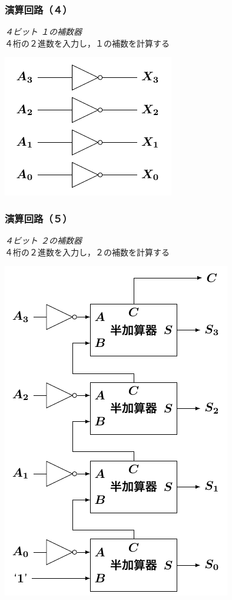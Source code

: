 \documentclass{beamer}                 %
\begin{document}
\begin{frame}
  \frametitle{演算回路（４）}
  \emph{４ビット １の補数器} \\
  ４桁の２進数を入力し，１の補数を計算する
  \vfill
  \centerline{\includegraphics[scale=1.0]{../Tikz/onesc.pdf}}
  \vfill
\end{frame}

\begin{frame}
  \frametitle{演算回路（５）}
  \emph{４ビット ２の補数器} \\
  ４桁の２進数を入力し，２の補数を計算する
  \vfill
  \centerline{\includegraphics[scale=0.7]{../Tikz/twosc.pdf}}
  \vfill
\end{frame}
\end{document}
